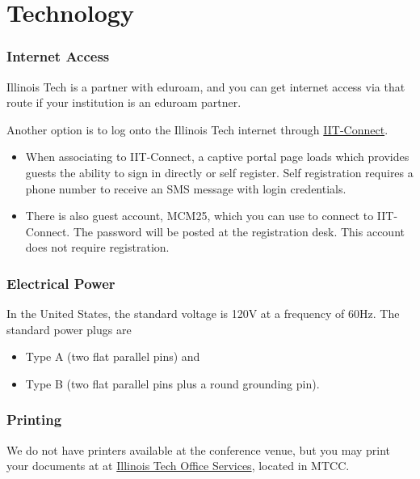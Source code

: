 \section{Technology}


\subsubsection{Internet Access}


Illinois Tech is a partner with eduroam, and you can get internet access via that route if your institution is an eduroam partner.

Another option is to log onto the Illinois Tech internet through \href{https://www.iit.edu/ots/internet-network/illinois-tech-wireless-networks/guest-wireless}{IIT-Connect}.

\begin{itemize}
	\item When associating to IIT-Connect, a captive portal page loads which provides guests the ability to sign in directly or self register. Self registration requires a phone number to receive an SMS message with login credentials.

	\item There is also guest account, MCM25, which you can use to connect to IIT-Connect.  The password will be posted at the registration desk.  This account does not require registration.
\end{itemize}

\subsubsection{Electrical Power}

In the United States, the standard voltage is 120V at a frequency of 60Hz.  The standard power plugs are
\begin{itemize}
	\item Type A (two flat parallel pins) and
	\item Type B (two flat parallel pins plus a round grounding pin).
\end{itemize}

\subsubsection{Printing}

We do not have printers available at the conference venue, but you may print your documents at
at \href{https://iitofficeservices.myprintdesk.net}{Illinois Tech Office Services}, located in MTCC.

